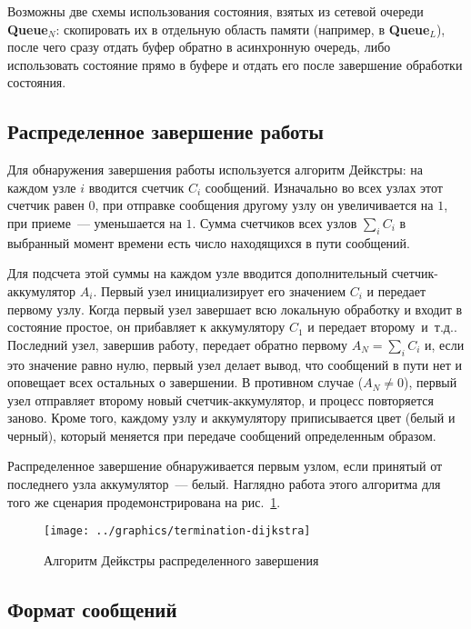\documentclass[12pt,a4paper,fleqn]{article}
\newcommand{\Code}[1]{\textbf{\mbox{#1}}}
\newcommand\etc{~и~т.д.}
\begin{document}
Возможны две схемы использования состояния, взятых из сетевой очереди \Code{Queue$_N$}: скопировать
их в отдельную область памяти (например, в \Code{Queue$_L$}), после чего сразу отдать буфер обратно
в асинхронную очередь, либо использовать состояние прямо в буфере и отдать его после завершение
обработки состояния.

\subsection{Распределенное завершение работы}

Для обнаружения завершения работы используется алгоритм Дейкстры: на каждом узле $i$
вводится счетчик $C_i$ сообщений. Изначально во всех узлах этот счетчик равен $0$, при
отправке сообщения другому узлу он увеличивается на $1$, при приеме~--- уменьшается на
$1$. Сумма счетчиков всех узлов $\sum_iC_i$ в выбранный момент времени есть число
находящихся в пути сообщений. 

Для подсчета этой суммы на каждом узле вводится дополнительный счетчик-аккумулятор
$A_i$. Первый узел инициализирует его значением $C_i$ и передает первому узлу. Когда
первый узел завершает всю локальную обработку и входит в состояние простое, он прибавляет
к аккумулятору $C_1$ и передает второму\etc. Последний узел, завершив работу, передает
обратно первому $A_N = \sum_iC_i$ и, если это значение равно нулю, первый узел делает
вывод, что сообщений в пути нет и оповещает всех остальных о завершении. В противном
случае ($A_N \neq 0$), первый узел отправляет второму новый счетчик-аккумулятор, и процесс
повторяется заново. Кроме того, каждому узлу и аккумулятору приписывается цвет (белый и
черный), который меняется при передаче сообщений определенным образом.

Распределенное завершение обнаруживается первым узлом, если принятый от последнего узла
аккумулятор~--- белый. Наглядно работа этого алгоритма для
того же сценария продемонстрирована на рис.~\ref{fig:termination-dijkstra}.

\begin{figure}[htb]
  \centering
  \texttt{[image: ../graphics/termination-dijkstra]}  
  \caption{Алгоритм Дейкстры распределенного завершения}
\label{fig:termination-dijkstra}
\end{figure}

\subsection{Формат сообщений}
\end{document}
